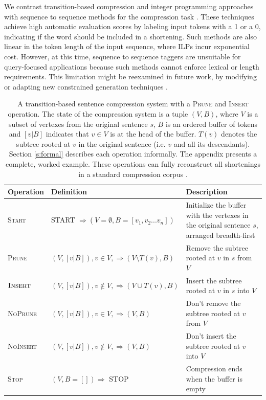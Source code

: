 \documentclass[11pt,a4paper]{article}
\begin{document}
We contrast transition-based compression and integer programming approaches with sequence to sequence methods for the compression task \cite{filippova2015sentence}. These techniques achieve high automatic evaluation scores by labeling input tokens with a 1 or a 0, indicating if the word should be included in a shortening. Such methods are also linear in the token length of the input sequence, where ILPs incur exponential cost. However, at this time, sequence to sequence taggers are unsuitable for query-focused applications because such methods cannot enforce lexical or length requirements. This limitation might be reexamined in future work, by modifying or adapting new constrained generation techniques \cite{N18-1119,aaimh}.


\begin{table}[]
\centering
\begin{tabular}{llp{70mm}}
\textbf{Operation} &             \textbf{Definition}                                                    &      \textbf{Description}    \\ \hline
\textsc{Start}      & START $\Rightarrow ( V=\emptyset,  B=[v_1, v_2 ... v_n])$ & Initialize the buffer with the vertexes in the original sentence $s$, arranged breadth-first \\ \hline
\textsc{Prune}              & $(V, [v|B]), v \in V,  \Rightarrow (V \setminus  T(v), B)$ & Remove the subtree rooted at $v$ in $s$ from $V$ \\  
$\textsc{Insert}$             & $(V, [v|B]), v \notin V, \Rightarrow (V \cup T(v), B)$ & Insert the subtree rooted at $v$ in $s$ into $V$  \\ \hline
\textsc{NoPrune}           & $(V, [v|B]), v \in V, \Rightarrow (V, B)$ & Don't remove the subtree rooted at $v$ from $V$  \\ 
\textsc{NoInsert}          &       $(V, [v|B]), v \notin V, \Rightarrow (V, B)$ &   Don't insert the subtree rooted at $v$ into $V$    \\ \hline
\textsc{Stop}             & $ (V, B=[]) \Rightarrow$ STOP & Compression ends when the buffer is empty \\                                               
\end{tabular}
\caption{A transition-based sentence compression system with a \textsc{Prune} and \textsc{Insert} operation. The state of the compression system is a tuple $(V, B)$, where $V$ is a subset of vertexes from the original sentence $s$, $B$ is an ordered buffer of tokens and $[v|B]$ indicates that $v \in V$ is at the head of the buffer. $T(v)$ denotes the subtree rooted at $v$ in the original sentence (i.e. $v$ and all its descendants). Section \ref{s:formal} describes each operation informally. The appendix presents a complete, worked example. These operations can fully reconstruct all shortenings in a standard compression corpus \cite{filippova2013overcoming}.}
\label{t:ops}
\end{table}
\end{document}
